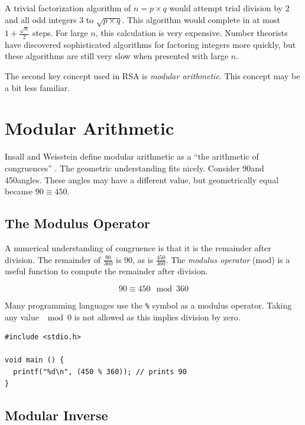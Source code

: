 \documentclass{book}
\begin{document}
A trivial factorization algorithm of $n=p \times q$ would attempt trial division by 2 and all odd integers 3 to $\sqrt{p \times q}$. This algorithm would complete in at most $1+\frac{\sqrt{n}}{2}$ steps. For large $n$, this calculation is very expensive. Number theorists have discovered sophisticated algorithms for factoring integers more quickly, but these algorithms are still very slow when presented with large $n$.

The second key concept used in RSA is \textit{modular arithmetic}. This concept may be a bit less familiar.

\section{Modular Arithmetic}

Insall and Weisstein define modular arithmetic as a ``the arithmetic of congruences'' \cite{weissteinModular}. The geometric understanding fits nicely. Consider 90\degree and 450\degree angles. These angles may have a different value, but geometrically equal because $90 \equiv 450$.

\subsection{The Modulus Operator}

A numerical understanding of congruence is that it is the remainder after division. The remainder of $\frac{90}{360}$ is 90, as is $\frac{450}{360}$. The \textit{modulus operator} (mod) is a useful function to compute the remainder after division.

\[
90 \equiv 450 \mod 360
\]

Many programming languages use the \texttt{\%} symbol as a modulus operator. Taking any value $\mod 0$ is not allowed as this implies division by zero.

\begin{lstlisting}[caption={The modulus operator in C}, captionpos=b, mathescape, xleftmargin=.25in, xrightmargin=.25in]
#include <stdio.h>

void main () {
  printf("%d\n", (450 % 360)); // prints 90
}

\end{lstlisting}

\subsection{Modular Inverse}
\end{document}
